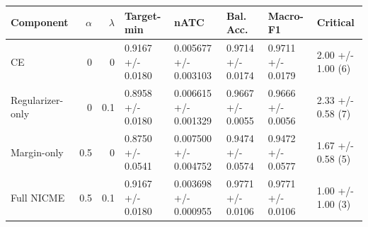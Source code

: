 \begin{tabular}{lrrlllll}
\toprule
Component & $\alpha$ & $\lambda$ & Target-min & nATC & Bal. Acc. & Macro-F1 & Critical \\
\midrule
CE & 0 & 0 & 0.9167 +/- 0.0180 & 0.005677 +/- 0.003103 & 0.9714 +/- 0.0174 & 0.9711 +/- 0.0179 & 2.00 +/- 1.00 (6) \\
Regularizer-only & 0 & 0.1 & 0.8958 +/- 0.0180 & 0.006615 +/- 0.001329 & 0.9667 +/- 0.0055 & 0.9666 +/- 0.0056 & 2.33 +/- 0.58 (7) \\
Margin-only & 0.5 & 0 & 0.8750 +/- 0.0541 & 0.007500 +/- 0.004752 & 0.9474 +/- 0.0574 & 0.9472 +/- 0.0577 & 1.67 +/- 0.58 (5) \\
Full NICME & 0.5 & 0.1 & 0.9167 +/- 0.0180 & 0.003698 +/- 0.000955 & 0.9771 +/- 0.0106 & 0.9771 +/- 0.0106 & 1.00 +/- 1.00 (3) \\
\bottomrule
\end{tabular}
